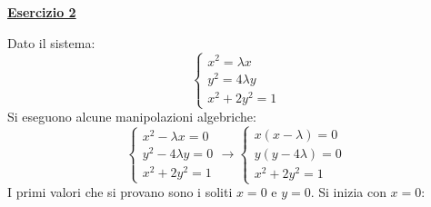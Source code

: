 \documentclass[a4paper]{article}
\newcommand{\example}[1]{\textcolor{Green4}{\textbf{#1}}}
\begin{document}
	\begin{flushleft}
		\example{\underline{Esercizio 2}}
	\end{flushleft}
	
	\noindent
	Dato il sistema:
	\begin{equation*}
		\begin{cases}
			x^{2} = \lambda x \\
			y^{2} = 4\lambda y \\
			x^{2} + 2y^{2} = 1
		\end{cases}
	\end{equation*}
	Si eseguono alcune manipolazioni algebriche:
	\begin{equation*}
		\begin{cases}
			x^{2} - \lambda x = 0 \\
			y^{2} - 4\lambda y= 0 \\
			x^{2} + 2y^{2} = 1
		\end{cases}
		\longrightarrow
		\begin{cases}
			x\left(x - \lambda\right) = 0 \\
			y\left(y - 4\lambda\right) = 0 \\
			x^{2} + 2y^{2} = 1
		\end{cases}
	\end{equation*}
	I primi valori che si provano sono i soliti $x = 0$ e $y = 0$. Si inizia con $x=0$:
\end{document}
